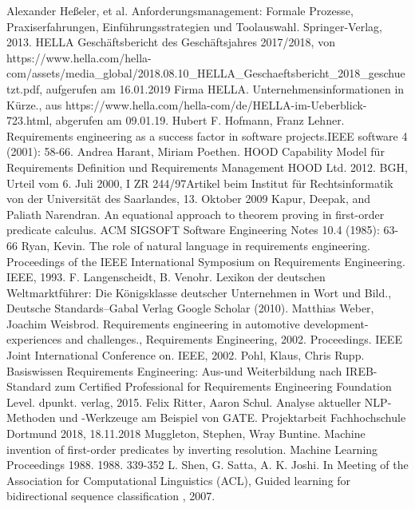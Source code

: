 \documentclass[12pt]{report}
\begin{document}
\begin{thebibliography}{20}
 Alexander Heßeler, et al. \glqq Anforderungsmanagement: Formale Prozesse, Praxiserfahrungen, Einführungsstrategien und Toolauswahl.\grqq{} Springer-Verlag, 2013.
 HELLA Geschäftsbericht des Geschäftsjahres 2017/2018, von https://www.hella.com/hella-com/assets/media\_global/2018.08.10\_HELLA\_Geschaeftsbericht\_2018\_geschuetzt.pdf, aufgerufen am 16.01.2019
Firma HELLA. \glqq Unternehmensinformationen in Kürze.\grqq , aus https://www.hella.com/hella-com/de/HELLA-im-Ueberblick-723.html, abgerufen am 09.01.19.
 Hubert F. Hofmann, Franz Lehner. \glqq Requirements engineering as a success factor in software projects.\grqq IEEE software 4 (2001): 58-66.
Andrea Harant, Miriam Poethen. \glqq HOOD Capability Model für Requirements Definition und Requirements Management \grqq{} HOOD Ltd. 2012.
BGH, \glqq Urteil vom 6. Juli 2000, I ZR 244/97\grqq Artikel beim Institut für Rechtsinformatik von der Universität des Saarlandes, 13. Oktober 2009
Kapur, Deepak, and Paliath Narendran. \glqq  An equational approach to theorem proving in first-order predicate calculus.\grqq{}  ACM SIGSOFT Software Engineering Notes 10.4 (1985): 63-66
Ryan, Kevin. \glqq The role of natural language in requirements engineering.\grqq{} Proceedings of the IEEE International Symposium on Requirements Engineering. IEEE, 1993.
F. Langenscheidt, B. Venohr. \glqq Lexikon der deutschen Weltmarktführer: Die Königsklasse deutscher Unternehmen in Wort und Bild.\grqq ,  Deutsche Standards–Gabal Verlag Google Scholar (2010).
Matthias Weber, Joachim Weisbrod. \glqq Requirements engineering in automotive development-experiences and challenges.\grqq , Requirements Engineering, 2002. Proceedings. IEEE Joint International Conference on. IEEE, 2002.
 Pohl, Klaus, Chris Rupp. \glqq Basiswissen Requirements Engineering: Aus-und Weiterbildung nach IREB-Standard zum Certified Professional for Requirements Engineering Foundation Level.\grqq{} dpunkt. verlag, 2015.
Felix Ritter, Aaron Schul. \glqq Analyse aktueller NLP-Methoden und -Werkzeuge am Beispiel von GATE.\grqq{} Projektarbeit Fachhochschule Dortmund 2018, 18.11.2018
Muggleton, Stephen, Wray Buntine. \glqq  Machine invention of first-order predicates by inverting resolution.\grqq{}  Machine Learning Proceedings 1988. 1988. 339-352
 L. Shen, G. Satta, A. K. Joshi. In Meeting of the Association for Computational Linguistics (ACL), \glqq  Guided learning for bidirectional sequence classification\grqq{} , 2007.

\end{thebibliography}
\end{document}
